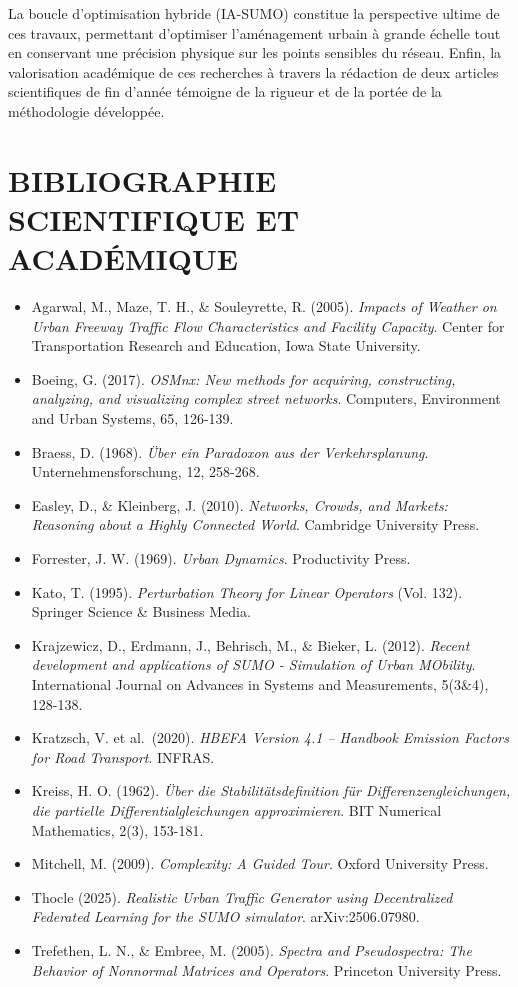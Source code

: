 \documentclass[10pt, a4paper]{article}
\providecommand{\tightlist}{}
\begin{document}
La boucle d'optimisation hybride (IA-SUMO) constitue la perspective
ultime de ces travaux, permettant d'optimiser l'aménagement urbain à
grande échelle tout en conservant une précision physique sur les points
sensibles du réseau. Enfin, la valorisation académique de ces recherches
à travers la rédaction de deux articles scientifiques de fin d'année
témoigne de la rigueur et de la portée de la méthodologie développée.

\newpage

\section{BIBLIOGRAPHIE SCIENTIFIQUE ET
ACADÉMIQUE}\label{bibliographie-scientifique-et-acaduxe9mique}

\begin{itemize}
\tightlist
\item
  Agarwal, M., Maze, T. H., \& Souleyrette, R. (2005). \emph{Impacts of
  Weather on Urban Freeway Traffic Flow Characteristics and Facility
  Capacity}. Center for Transportation Research and Education, Iowa
  State University.
\item
  Boeing, G. (2017). \emph{OSMnx: New methods for acquiring,
  constructing, analyzing, and visualizing complex street networks}.
  Computers, Environment and Urban Systems, 65, 126-139.
\item
  Braess, D. (1968). \emph{Über ein Paradoxon aus der Verkehrsplanung}.
  Unternehmensforschung, 12, 258-268.
\item
  Easley, D., \& Kleinberg, J. (2010). \emph{Networks, Crowds, and
  Markets: Reasoning about a Highly Connected World}. Cambridge
  University Press.
\item
  Forrester, J. W. (1969). \emph{Urban Dynamics}. Productivity Press.
\item
  Kato, T. (1995). \emph{Perturbation Theory for Linear Operators} (Vol.
  132). Springer Science \& Business Media.
\item
  Krajzewicz, D., Erdmann, J., Behrisch, M., \& Bieker, L. (2012).
  \emph{Recent development and applications of SUMO - Simulation of
  Urban MObility}. International Journal on Advances in Systems and
  Measurements, 5(3\&4), 128-138.
\item
  Kratzsch, V. et al.~(2020). \emph{HBEFA Version 4.1 -- Handbook
  Emission Factors for Road Transport}. INFRAS.
\item
  Kreiss, H. O. (1962). \emph{Über die Stabilitätsdefinition für
  Differenzengleichungen, die partielle Differentialgleichungen
  approximieren}. BIT Numerical Mathematics, 2(3), 153-181.
\item
  Mitchell, M. (2009). \emph{Complexity: A Guided Tour}. Oxford
  University Press.
\item
  Thocle (2025). \emph{Realistic Urban Traffic Generator using
  Decentralized Federated Learning for the SUMO simulator}.
  arXiv:2506.07980.
\item
  Trefethen, L. N., \& Embree, M. (2005). \emph{Spectra and
  Pseudospectra: The Behavior of Nonnormal Matrices and Operators}.
  Princeton University Press.
\end{itemize}
\end{document}
